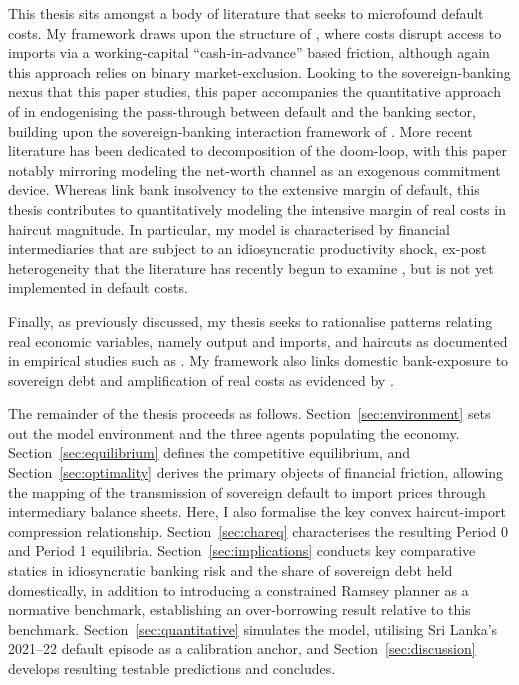 \documentclass[11pt]{article}
\theoremstyle{definition}
\theoremstyle{plain}
\theoremstyle{remark}
\begin{document}
This thesis sits amongst a body of literature that seeks to microfound default costs. My framework draws upon the structure of \citet{mendoza_general_2012}, where costs disrupt access to imports via a working-capital ``cash-in-advance'' based friction, although again this approach relies on binary market-exclusion. Looking to the sovereign-banking nexus that this paper studies, this paper accompanies the quantitative approach of \citet{sosa-padilla_sovereign_2018} in endogenising the pass-through between default and the banking sector, building upon the sovereign-banking interaction framework of \citet{bocola_pass-through_2016}. More recent literature has been dedicated to decomposition of the doom-loop, with this paper notably mirroring \citet{rojas_bright_2024} modeling the net-worth channel as an exogenous commitment device. Whereas \citet{rojas_bright_2024} link bank insolvency to the extensive margin of default, this thesis contributes to quantitatively modeling the intensive margin of real costs in haircut magnitude. In particular, my model is characterised by financial intermediaries that are subject to an idiosyncratic productivity shock, ex-post heterogeneity that the literature has recently begun to examine \citep{arellano_sovereign_2026, abad_breaking_2019}, but is not yet implemented in default costs.

Finally, as previously discussed, my thesis seeks to rationalise patterns relating real economic variables, namely output and imports, and haircuts as documented in empirical studies such as \citet{asonuma_costs_2024, asonuma_trade_2025, farah-yacoub_social_2024, graf_von_luckner_sovereign_2024, reinhart_financial_2011}. My framework  also links domestic bank-exposure to sovereign debt and amplification of real costs as evidenced by \citet{gennaioli_sovereign_2014}.

The remainder of the thesis proceeds as follows. Section~\ref{sec:environment} sets out the model environment and the three agents populating the economy. Section~\ref{sec:equilibrium} defines the competitive equilibrium, and Section~\ref{sec:optimality} derives the primary objects of financial friction, allowing the mapping of the transmission of sovereign default to import prices through intermediary balance sheets. Here, I also formalise the key convex haircut-import compression relationship. Section~\ref{sec:chareq} characterises the resulting Period 0 and Period 1 equilibria. Section~\ref{sec:implications} conducts key comparative statics in idiosyncratic banking risk and the share of sovereign debt held domestically, in addition to introducing a constrained Ramsey planner as a normative benchmark, establishing an over-borrowing result relative to this benchmark. Section~\ref{sec:quantitative} simulates the model, utilising Sri Lanka's 2021--22 default episode as a calibration anchor, and Section~\ref{sec:discussion} develops resulting testable predictions and concludes.
\end{document}
